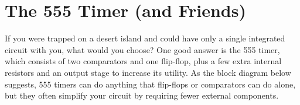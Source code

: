 \section{The 555 Timer (and Friends)}
\label{lab_timers}


\bigskip

If you were trapped on a desert island and could have only a single integrated circuit with you, what would you choose?  One good answer is the 555 timer, which consists of two comparators and one flip-flop, plus a few extra internal resistors and an output stage to increase its utility.  As the block diagram below suggests, 555 timers can do anything that flip-flops or comparators can do alone, but they often simplify your circuit by requiring fewer external components. 

